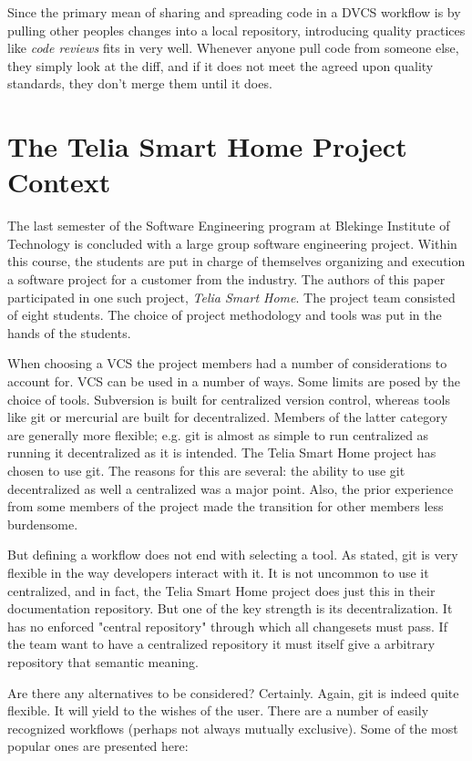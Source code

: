 \documentclass{llncs}
\begin{document}
Since the primary mean of sharing and spreading code in a DVCS
workflow is by pulling other peoples changes into a local repository,
introducing quality practices like \emph{code reviews} fits in very
well. Whenever anyone pull code from someone else, they simply look at
the diff, and if it does not meet the agreed upon quality standards,
they don't merge them until it does\cite{osullivan09}.

\section{The Telia Smart Home Project Context}
\label{sec:telia}

The last semester of the Software Engineering program at Blekinge
Institute of Technology is concluded with a large group software
engineering project. Within this course, the students are put in
charge of themselves organizing and execution a software project for a
customer from the industry. The authors of this paper participated in
one such project, \emph{Telia Smart Home}. The project team consisted
of eight students. The choice of project methodology and tools was put
in the hands of the students.

When choosing a VCS the project members had a number of considerations
to account for. VCS can be used in a number of ways. Some limits are
posed by the choice of tools. Subversion is built for centralized
version control, whereas tools like git or mercurial are built for
decentralized. Members of the latter category are generally more
flexible; e.g. git is almost as simple to run centralized as running
it decentralized as it is intended. The Telia Smart Home project has
chosen to use git. The reasons for this are several: the ability to
use git decentralized as well a centralized was a major point. Also,
the prior experience from some members of the project made the
transition for other members less burdensome.

But defining a workflow does not end with selecting a tool. As stated, 
git is very flexible in the way developers interact with it. It is not
uncommon to use it centralized, and in fact, the Telia Smart Home project
does just this in their documentation repository. But one of the key 
strength is its decentralization. It has no enforced "central repository"
through which all changesets must pass. If the team want to have a 
centralized repository it must itself give a arbitrary repository that
semantic meaning.

Are there any alternatives to be considered? Certainly. Again, git is 
indeed quite flexible. It will yield to the wishes of the user. There are 
a number of easily recognized workflows (perhaps not always mutually
exclusive). Some of the most popular ones are presented here:
\end{document}
